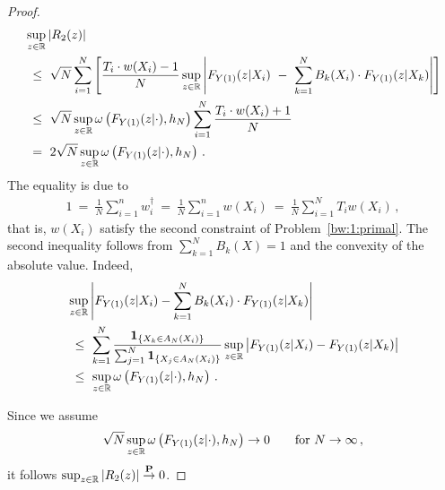 \begin{proof}
\begin{align*}
&
  \sup_{z\in\R}
  \left| 
  R_2(z)
  \right|
  \\
  &
  \ 
  \le
  \ 
  \sqrt{N}
    \sum_{i=1}^{N} 
    \left[ 
  \frac{
    T_i\cdot w(X_i) -1 }{N}
  \sup_{z\in\R}
    \left| 
  F_{Y(1)}(z|X_i)
    \ 
    -
    \ 
    \sum_{k=1}^{N} 
    B_k(X_i)
    \cdot
  F_{Y(1)}(z|X_k)
    \right|
    \right]
    \\
    &
  \ 
    \le
  \ 
    \sqrt{N}
  \sup_{z\in\R}
  \omega
  \left( 
    F_{Y(1)}(z|\cdot)
    ,h_N
  \right)
  \sum_{i=1}^{N} 
  \frac{
    T_i\cdot w(X_i) +1 }{N}
    \\
    &
  \ 
    =
  \ 
    2
    \sqrt{N}
  \sup_{z\in\R}
  \omega
  \left( 
    F_{Y(1)}(z|\cdot)
    ,h_N
  \right)
  \,.
\end{align*}
The equality is due to 
\begin{gather}
  1
  \ 
  =
  \ 
\frac{1}{N}\sum_{i=1}^{n}w_i^\dagger
  \ 
  =
  \ 
\frac{1}{N}\sum_{i=1}^{n}w(X_i)
  \ 
=
  \ 
\frac{1}{N}\sum_{i=1}^{N}T_iw(X_i)
\,,
\end{gather}
that is, $w(X_i)$ satisfy the second constraint of Problem~\ref{bw:1:primal}.
The second inequality follows from 
$\sum_{k=1}^{N}B_k(X)=1$ and the convexity of the absolute value. 
Indeed,
\begin{align*}
&
  \sup_{z\in\R}
  \left| 
  F_{Y(1)}(z|X_i)
  -
  \sum_{k=1}^{N} 
  B_k(X_i)
  \cdot
  F_{Y(1)}(z|X_k)
  \right|
  \\
  &
  \ 
  \le
  \ 
  \sum_{k=1}^{N} 
  \frac{\mathbf{1}_{\left\{ X_k\in A_N(X_i) \right\}}}
  {
    \sum_{j=1}^{N} 
\mathbf{1}_{\left\{ X_j\in A_N(X_i) \right\}}
  }
  \sup_{z\in\R}
  \left| 
  F_{Y(1)}(z|X_i)
  -
  F_{Y(1)}(z|X_k)
  \right|
  \\
  &
  \ 
  \le
  \ 
  \sup_{z\in\R}
  \omega
  \left( 
    F_{Y(1)}(z|\cdot)
    ,h_N
  \right)
  \,.
\end{align*}

Since we assume
\begin{gather*}
  \sqrt{N}
  \sup_{z\in\R}
  \omega
  \left( 
    F_{Y(1)}(z|\cdot)
    ,h_N
  \right)
  \to
  0
  \qquad
  \text{for}\ 
  N\to \infty
  \,,
\end{gather*}
it follows
$\sup_{z\in\mathbb{R}}|R_2(z)|\overset{\mathbf{P}}{\to}0$.
\end{proof}
